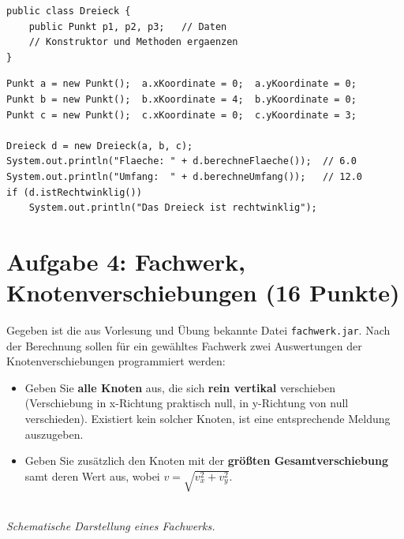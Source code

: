 \documentclass[
	fontsize=12pt,
	paper=a4,
	numbers=noenddot,
	parskip=half,
	openany
]{scrbook}
\begin{document}
\begin{lstlisting}
public class Dreieck {
    public Punkt p1, p2, p3;   // Daten
    // Konstruktor und Methoden ergaenzen
}
\end{lstlisting}

\begin{lstlisting}
Punkt a = new Punkt();  a.xKoordinate = 0;  a.yKoordinate = 0;
Punkt b = new Punkt();  b.xKoordinate = 4;  b.yKoordinate = 0;
Punkt c = new Punkt();  c.xKoordinate = 0;  c.yKoordinate = 3;

Dreieck d = new Dreieck(a, b, c);
System.out.println("Flaeche: " + d.berechneFlaeche());  // 6.0
System.out.println("Umfang:  " + d.berechneUmfang());   // 12.0
if (d.istRechtwinklig())
    System.out.println("Das Dreieck ist rechtwinklig");
\end{lstlisting}

\clearpage
\section*{Aufgabe 4: Fachwerk, Knotenverschiebungen \hfill (16 Punkte)}

Gegeben ist die aus Vorlesung und Übung bekannte Datei \texttt{fachwerk.jar}.
Nach der Berechnung sollen für ein gewähltes Fachwerk zwei Auswertungen der Knotenverschiebungen programmiert werden:
\begin{itemize}[nosep]
	\item Geben Sie \textbf{alle Knoten} aus, die sich \textbf{rein vertikal} verschieben (Verschiebung in x-Richtung praktisch null, in y-Richtung von null verschieden). Existiert kein solcher Knoten, ist eine entsprechende Meldung auszugeben.
	\item Geben Sie zusätzlich den Knoten mit der \textbf{größten Gesamtverschiebung} samt deren Wert aus, wobei $v = \sqrt{v_x^2 + v_y^2}$.
\end{itemize}

\begin{center}
\\[-0.3em]
{\footnotesize\itshape Schematische Darstellung eines Fachwerks.}
\end{center}
\end{document}
